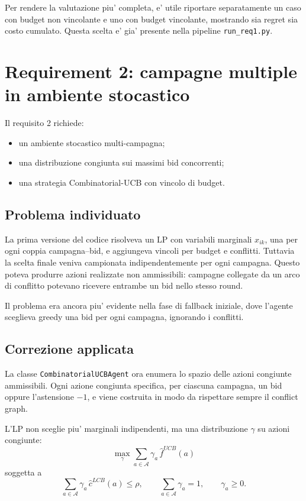 \documentclass[11pt,a4paper]{article}
\begin{document}
Per rendere la valutazione piu' completa, e' utile riportare separatamente un
caso con budget non vincolante e uno con budget vincolante, mostrando sia regret
sia costo cumulato. Questa scelta e' gia' presente nella pipeline
\texttt{run\_req1.py}.

\section{Requirement 2: campagne multiple in ambiente stocastico}

Il requisito 2 richiede:
\begin{itemize}
  \item un ambiente stocastico multi-campagna;
  \item una distribuzione congiunta sui massimi bid concorrenti;
  \item una strategia Combinatorial-UCB con vincolo di budget.
\end{itemize}

\subsection{Problema individuato}

La prima versione del codice risolveva un LP con variabili marginali
\(x_{ik}\), una per ogni coppia campagna--bid, e aggiungeva vincoli per budget e
conflitti. Tuttavia la scelta finale veniva campionata indipendentemente per
ogni campagna. Questo poteva produrre azioni realizzate non ammissibili:
campagne collegate da un arco di conflitto potevano ricevere entrambe un bid
nello stesso round.

Il problema era ancora piu' evidente nella fase di fallback iniziale, dove
l'agente sceglieva greedy una bid per ogni campagna, ignorando i conflitti.

\subsection{Correzione applicata}

La classe \texttt{CombinatorialUCBAgent} ora enumera lo spazio delle azioni
congiunte ammissibili. Ogni azione congiunta specifica, per ciascuna campagna,
un bid oppure l'astensione \(-1\), e viene costruita in modo da rispettare
sempre il conflict graph.

L'LP non sceglie piu' marginali indipendenti, ma una distribuzione \(\gamma\) su
azioni congiunte:
\[
  \max_{\gamma} \sum_{a \in \mathcal{A}} \gamma_a \, \widehat{f}^{UCB}(a)
\]
soggetta a
\[
  \sum_{a \in \mathcal{A}} \gamma_a \, \widehat{c}^{LCB}(a) \leq \rho,
  \qquad
  \sum_{a \in \mathcal{A}} \gamma_a = 1,
  \qquad
  \gamma_a \geq 0.
\]
\end{document}
